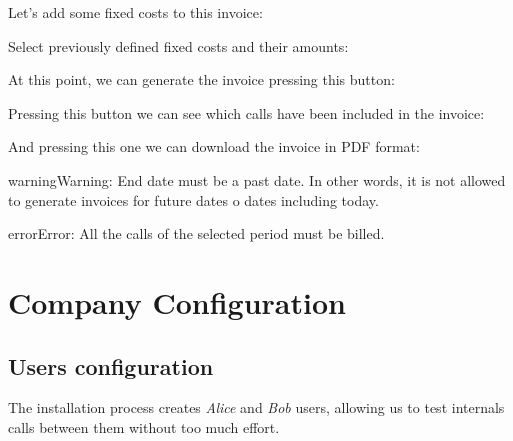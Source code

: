 \documentclass[letterpaper,10pt,english]{sphinxmanual}
\begin{document}
Let's add some fixed costs to this invoice:


Select previously defined fixed costs and their amounts:


At this point, we can generate the invoice pressing this button:


Pressing this button we can see which calls have been included in the invoice:


And pressing this one we can download the invoice in PDF format:


\begin{notice}{warning}{Warning:}
End date must be a past date. In other words, it is not allowed to
generate invoices for future dates o dates including today.
\end{notice}

\begin{notice}{error}{Error:}
All the calls of the selected period must be billed.
\end{notice}


\chapter{Company Configuration}
\label{company/index:company-configuration}\label{company/index::doc}

\section{Users configuration}
\label{company/users::doc}\label{company/users:users}\label{company/users:users-configuration}
The installation process creates \emph{Alice} and \emph{Bob} users, allowing us
to test internals calls between them without too much effort.
\end{document}
